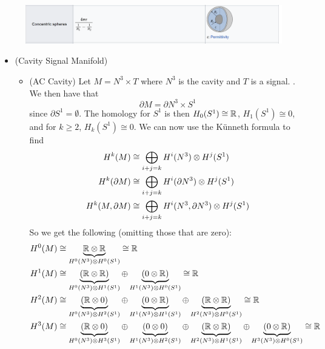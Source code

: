 \documentclass{article}
\begin{document}
\begin{example}~
\begin{figure}
    \centering
    \includegraphics[width=.6\textwidth]{figures/cavity_capacitance.png}
\end{figure}
\begin{itemize}
    \item (Cavity Signal Manifold) 
    
        \begin{itemize}
            \item (AC Cavity) Let $M=N^3 \times T$ where $N^3$ is the cavity and $T$ is a signal. . We then have that 
\begin{equation}
    \partial M = \partial N^3 \times S^1
\end{equation}
since $\partial S^1 = \emptyset$. The homology for $S^1$ is then $H_0(S^1)\cong \mathbb{R}$, $H_1(S^1)\cong 0$, and for $k\geq 2$, $H_k(S^1)\cong 0$. We can now use the K\"unneth formula to find
\begin{align}
    H^k(M) &\cong \bigoplus_{i+j=k} H^i(N^3)\otimes H^j(S^1)\\
    H^k({\partial M}) &\cong \bigoplus_{i+j=k} H^i(\partial N^3)\otimes H^j(S^1)\\
    H^k(M,{\partial M}) &\cong \bigoplus_{i+j=k} H^i(N^3,\partial N^3)\otimes H^j(S^1)
\end{align}
So we get the following (omitting those that are zero):
\begin{align*}
    H^0(M) &\cong \underbrace{\R \otimes \R}_{H^0(N^3)\otimes H^0(S^1)} \cong \R\\
    H^1(M) &\cong \underbrace{(\R \otimes \R)}_{H^0(N^3)\otimes H^1(S^1)} \oplus \underbrace{(0 \otimes \R)}_{H^1(N^3)\otimes H^0(S^1)} \cong \R\\
    H^2(M) &\cong \underbrace{(\R \otimes 0)}_{H^0(N^3)\otimes H^2(S^1)} \oplus \underbrace{(0 \otimes \R)}_{H^1(N^3)\otimes H^1(S^1)} \oplus \underbrace{(\R \otimes \R)}_{H^2(N^3)\otimes H^0(S^1)} \cong \R\\
    H^3(M) &\cong \underbrace{(\R \otimes 0)}_{H^0(N^3)\otimes H^3(S^1)} \oplus \underbrace{(0 \otimes 0)}_{H^1(N^3)\otimes H^2(S^1)} \oplus \underbrace{(\R \otimes \R)}_{H^2(N^3)\otimes H^1(S^1)} \oplus \underbrace{(0 \otimes \R)}_{H^3(N^3)\otimes H^0(S^1)} \cong \R\\

\end{align*}
\end{itemize}
\end{itemize}
\end{example}
\end{document}
